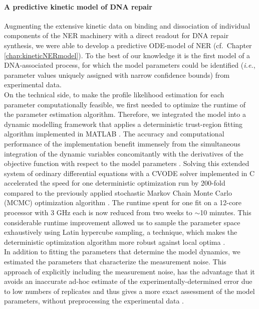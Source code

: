 \paragraph{A predictive kinetic model of DNA repair}
Augmenting the extensive kinetic data on binding and dissociation of individual components of the NER machinery \cite{Luijsterburg2010} with a direct readout for DNA repair synthesis, we were able to develop a predictive ODE-model of NER (cf.\ Chapter \ref{chap:kineticNERmodel}). To the best of our knowledge it is the first model of a DNA-associated process, for which the model parameters could be identified (\textit{i.e.}, parameter values uniquely assigned with narrow confidence bounds) from experimental data. \\
On the technical side, to make the profile likelihood estimation for each parameter computationally feasible, we first needed to optimize the runtime of the parameter estimation algorithm. Therefore, we integrated the model into a dynamic modelling framework that applies a deterministic trust-region fitting algorithm implemented in MATLAB \cite{Raue2009}. The accuracy and computational performance of the implementation benefit immensely from the simultaneous integration of the dynamic variables concomitantly with the derivatives of the objective function with respect to the model parameters \cite{conn2009introduction,Ramachandran2010,Raue2013}. Solving this extended system of ordinary differential equations with a CVODE solver implemented in C accelerated the speed for one deterministic optimization run by 200-fold compared to the previously applied stochastic Markov Chain Monte Carlo (MCMC) optimization algorithm \cite{Terstiege2010}. The runtime spent for one fit on a 12-core processor with 3 GHz each is now reduced from two weeks to $\sim$10 minutes. This considerable runtime improvement allowed us to sample the parameter space exhaustively using Latin hypercube sampling, a technique, which makes the deterministic optimization algorithm more robust against local optima \cite{Raue2013}.\\
In addition to fitting the parameters that determine the model dynamics, we estimated the parameters that characterize the measurement noise. This approach of explicitly including the measurement noise, has the advantage that it avoids an inaccurate ad-hoc estimate of the experimentally-determined error due to low numbers of replicates and thus gives a more exact assessment of the model parameters, without preprocessing the experimental data \cite{Raue2013}. \\
